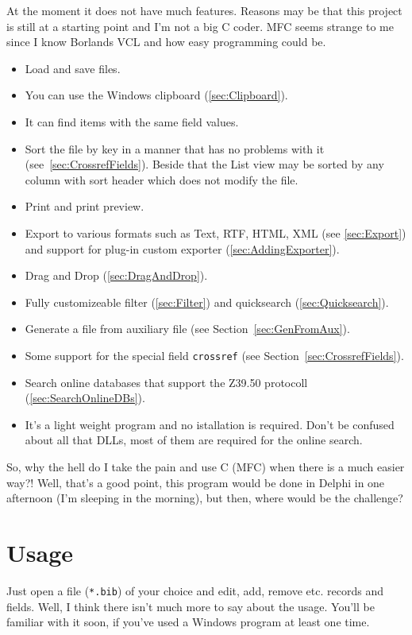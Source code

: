 \documentclass[oneside,10pt]{article}
\newcommand{\Rplus}{\protect\nolinebreak\hspace{-.07em}\protect\raisebox{.25ex}{\small\textbf{+}}}
\newcommand{\Cpp}{C\Rplus\Rplus}
\begin{document}
At the moment it does not have much features. Reasons may be that this project
is still at a starting point and I'm not a big \Cpp{} coder. MFC seems strange to
me since I know Borlands VCL and how easy programming could be.
\begin{itemize}
  \item Load and save \BibTeX{} files.
  \item You can use the Windows clipboard (\ref{sec:Clipboard}).
  \item It can find items with the same field values.
  \item Sort the file by key in a manner that \BibTeX{} has no problems with it
  (see~\ref{sec:CrossrefFields}). Beside that the List view may be sorted by any
  column with sort header which does not modify the file.
  \item Print and print preview.
  \item Export to various formats such as Text, RTF, HTML, XML (see \ref{sec:Export})
    and support for plug-in custom exporter (\ref{sec:AddingExporter}).
  \item Drag and Drop (\ref{sec:DragAndDrop}).
  \item Fully customizeable filter (\ref{sec:Filter}) and quicksearch (\ref{sec:Quicksearch}).
  \item Generate a \BibTeX{} file from auxiliary file (see Section~\ref{sec:GenFromAux}).
  \item Some support for the special field \verb|crossref| (see Section~\ref{sec:CrossrefFields}).
  \item Search online databases that support the Z39.50 protocoll (\ref{sec:SearchOnlineDBs}).
  \item It's a light weight program and no istallation is required. Don't be confused
    about all that DLLs, most of them are required for the online search.
\end{itemize}

So, why the hell do I take the pain and use \Cpp{} (MFC) when there is a much easier
way?! Well, that's a good point, this program would be done in Delphi in one
afternoon (I'm sleeping in the morning), but then, where would be the challenge?

\section{Usage}
\label{sec:Usage}

Just open a \BibTeX{} file (\verb|*.bib|) of your choice and edit, add, remove etc. records and fields.
Well, I think there isn't much more to say about the usage. You'll be familiar
with it soon, if you've used a Windows program at least one time.
\end{document}
